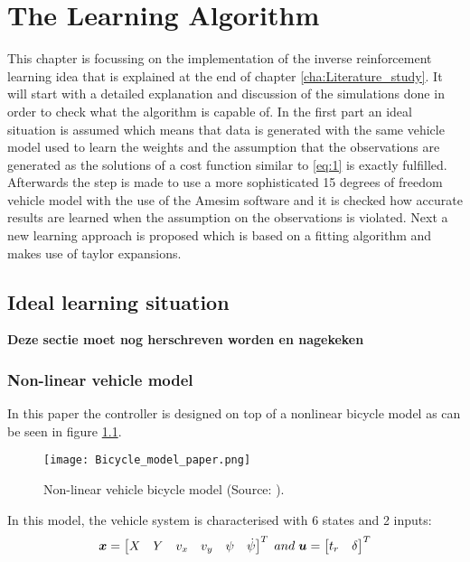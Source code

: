 \chapter{The Learning Algorithm\\}
\label{cha:Learning_algorithm}

This chapter is focussing on the implementation of the inverse reinforcement learning idea that is explained at the end of chapter \ref{cha:Literature_study}. It will start with a detailed explanation and discussion of the simulations done in order to check what the algorithm is capable of. In the first part an ideal situation is assumed which means that data is generated with the same vehicle model used to learn the weights and the assumption that the observations are generated as the solutions of a cost function similar to \ref{eq:1} is exactly fulfilled. Afterwards the step is made to use a more sophisticated 15 degrees of freedom vehicle model with the use of the Amesim software and it is checked how accurate results are learned when the assumption on the observations is violated. Next a new learning approach is proposed which is based on a fitting algorithm and makes use of taylor expansions. 

\section{Ideal learning situation }

\textbf{Deze sectie moet nog herschreven worden en nagekeken}

\subsection{Non-linear vehicle model}\label{sec:Vehicle_models}
In this paper the controller is designed on top of a nonlinear bicycle model \cite{TongDuySon2019} as can be seen in figure \ref{fig:bicycle_model}.\\

\begin{figure}[h!]
	\centering
	\texttt{[image: Bicycle\_model\_paper.png]}
	\caption{Non-linear vehicle bicycle model (Source: \cite{TongDuySon2019}).}
	\label{fig:bicycle_model}
\end{figure}

In this model, the vehicle system is characterised with 6 states and 2 inputs:
\begin{equation}\label{eq:bicycle_model}
\centering
\bm{x} = 
\begin{bmatrix}
X & Y & v_x & v_y & \psi & \dot{\psi}
\end{bmatrix}^{T}
\; and \; \bm{u} = 
\begin{bmatrix}
t_r & \delta
\end{bmatrix}^{T}
\end{equation}

